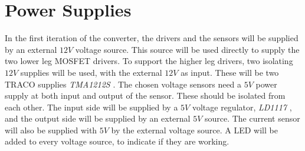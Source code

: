 \section{Power Supplies}\label{power_supplies}
In the first iteration of the converter, the drivers and the sensors will be supplied by an external $12V$ voltage source. This source will be used directly to supply the two lower leg MOSFET drivers. To support the higher leg drivers, two isolating $12V$ supplies will be used, with the external $12V$ as input. These will be two TRACO supplies \textit{TMA1212S} \cite{traco_tma1212}. The chosen voltage sensors need a $5V$ power supply at both input and output of the sensor. These should be isolated from each other. The input side will be supplied by a $5V$ voltage regulator, \textit{LD1117} \cite{LD1117}, and the output side will be supplied by an external $5V$ source. The current sensor will also be supplied with $5V$ by the external voltage source. A LED will be added to every voltage source, to indicate if they are working.